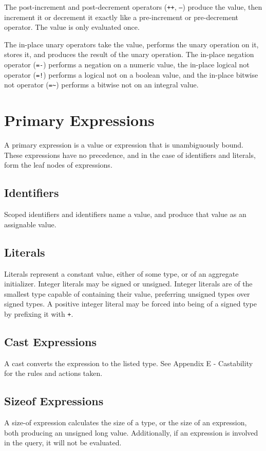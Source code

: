 \documentclass[letterpaper,12pt]{book}
\begin{document}
The post-increment and post-decrement operators (\texttt{++}, \texttt{--}) produce the value, then increment it or decrement it exactly like a pre-increment or pre-decrement operator. The value is only evaluated once.

The in-place unary operators take the value, performs the unary operation on it, stores it, and produces the result of the unary operation. The in-place negation operator (\texttt{=-}) performs a negation on a numeric value, the in-place logical not operator (\texttt{=!}) performs a logical not on a boolean value, and the in-place bitwise not operator (\texttt{=\~{}}) performs a bitwise not on an integral value.

\section{Primary Expressions}



A primary expression is a value or expression that is unambiguously bound. These expressions have no precedence, and in the case of identifiers and literals, form the leaf nodes of expressions.

\subsection{Identifiers}

Scoped identifiers and identifiers name a value, and produce that value as an assignable value.

\subsection{Literals}



Literals represent a constant value, either of some type, or of an aggregate initializer. Integer literals may be signed or unsigned. Integer literals are of the smallest type capable of containing their value, preferring unsigned types over signed types. A positive integer literal may be forced into being of a signed type by prefixing it with \texttt{+}.

\subsection{Cast Expressions}

A cast converts the expression to the listed type. See Appendix E - Castability for the rules and actions taken.

\subsection{Sizeof Expressions}

A size-of expression calculates the size of a type, or the size of an expression, both producing an unsigned long value. Additionally, if an expression is involved in the query, it will not be evaluated.
\end{document}
